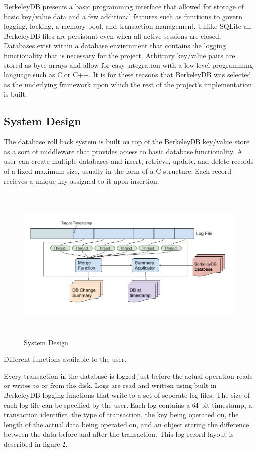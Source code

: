 \documentclass{article}
\begin{document}
BerkeleyDB presents a basic programming interface that allowed for storage of basic key/value data and a few additional features such as functions to govern logging, locking, a memory pool, and transaction management. Unlike SQLite all BerkeleyDB files are persistant even when all active sessions are closed. Databases exist within a database environment that contains the logging functionality that is necessary for the project. Arbitrary key/value pairs are stored as byte arrays and allow for easy integration with a low level programming language such as C or C++. It is for these reasons that BerkeleyDB was selected as the underlying framework upon which the rest of the project's implementation is built.

\subsection{System Design}
The database roll back system is built on top of the BerkeleyDB key/value store as a sort of middleware that provides access to basic database functionality. A user can create multiple databases and insert, retrieve, update, and delete records of a fixed maximum size, usually in the form of a C structure. Each record recieves a unique key assigned to it upon insertion. 

\begin{figure}
    \centering
    \includegraphics[height=3in]{rollbackDesgin.png}
    \caption{System Design}
    \label{fig:design1}
\end{figure}

Different functions available to the user.

Every transaction in the database is logged just before the actual operation reads or writes to or from the disk. Logs are read and written using built in BerkeleyDB logging functions that write to a set of seperate log files. The size of each log file can be specified by the user. Each log contains a 64 bit timestamp, a transaction identifier, the type of transaction, the key being operated on, the length of the actual data being operated on, and an object storing the difference between the data before and after the transaction. This log record layout is described in figure 2.
\end{document}

